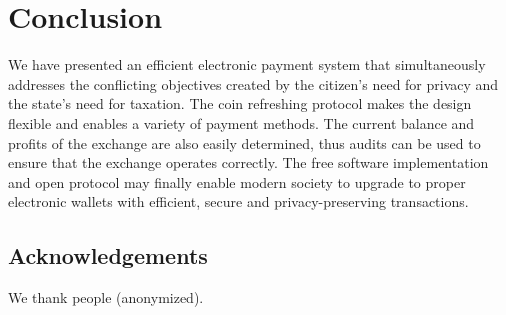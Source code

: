 \documentclass[sigconf, authordraft]{acmart}
\begin{document}
%


\section{Conclusion}

We have presented an efficient electronic payment system that
simultaneously addresses the conflicting objectives created by the
citizen's need for privacy and the state's need for taxation.  The
coin refreshing protocol makes the design flexible and enables a
variety of payment methods.  The current balance and profits of the
exchange are also easily determined, thus audits can be used to ensure
that the exchange operates correctly.  The free software
implementation and open protocol may finally enable modern society to
upgrade to proper electronic wallets with efficient, secure and
privacy-preserving transactions.

\subsection*{Acknowledgements}

We thank people (anonymized).
\newpage



\end{document}
